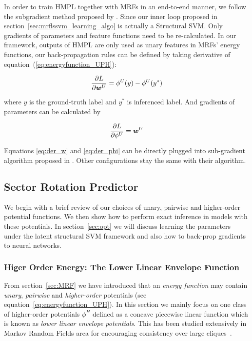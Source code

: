 \documentclass[sigconf, anonymous, review]{acmart}
\renewcommand{\citename}{\citet}
\renewcommand{\cite}{\citep}
\begin{document}
In order to train HMPL together with MRFs in an end-to-end manner,
we follow the subgradient method proposed by \citename{witoonchart2017application}.
Since our inner loop proposed in section~\ref{sec:mrflssvm_learning_algo}
is actually a Structural SVM. Only gradients of parameters and feature
functions need to be re-calculated. 
In our framework, outputs of HMPL are only used as unary features in MRFs'
energy functions, our back-propagation rules can be defined by
taking derivative of equation~(\ref{eq:energyfunction_UPH}):

\begin{align}
  \label{eq:der_w}
  \frac{\partial L}{\partial {\boldsymbol{w}}^U} = \phi^U(y)-\phi^U(y^*)
\end{align}

\noindent where $y$ is the ground-truth label and $y^*$ is
inferenced label. And gradients of parameters can be calculated by

\begin{align}
  \label{eq:der_phi}
  \frac{\partial L}{\partial \phi^U} = {\boldsymbol{w}}^U
\end{align}

Equations \eqref{eq:der_w} and \eqref{eq:der_phi} can be directly plugged
into sub-gradient algorithm proposed in \cite{witoonchart2017application}.
Other configurations stay the same with their algorithm.

\subsection{Sector Rotation Predictor}
\label{sec:srp}

We begin with a brief review of our choices of unary, pairwise
and higher-order potential functions. We then show how to perform
exact inference in models with these potentials. In
section~\ref{sec:opt} we will discuss learning the
parameters under the latent structural SVM framework and also how
to back-prop gradients to neural networks.


\subsubsection{Higer Order Energy: The Lower Linear Envelope Function}
\label{sec:llep}

From section~\ref{sec:MRF} we have introduced that an
\emph{energy function} may contain \emph{unary}, \emph{pairwise}
and \emph{higher-order} potentials (see
equation~\eqref{eq:energyfunction_UPH}). In this section we
mainly focus on one class of higher-order potentials $\phi^H$
defined as a concave piecewise linear function which is known as
\emph{lower linear envelope potentials}. This has been studied
extensively in Markov Random Fields area for encouraging
consistency over large
cliques~\cite{Kohli:CVPR07,Nowozin:2011,Gould:ICML2011}.
\end{document}
